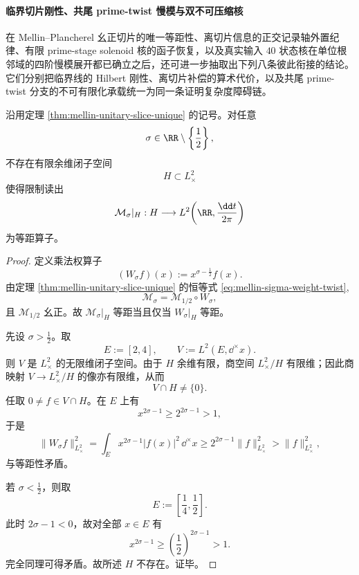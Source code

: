 \paragraph{临界切片刚性、共尾 prime-twist 慢模与双不可压缩核}\label{subsubsec:xi-time-part9v-critical-slice-cofinal-prime-twist-rigidity}
在 Mellin--Plancherel 幺正切片的唯一等距性、离切片信息的正交记录轴外置纪律、有限 prime-stage solenoid 核的函子恢复，以及真实输入 \(40\) 状态核在单位根邻域的四阶慢模展开都已确立之后，还可进一步抽取出下列八条彼此衔接的结论。它们分别把临界线的 Hilbert 刚性、离切片补偿的算术代价，以及共尾 prime-twist 分支的不可有限化承载统一为同一条证明复杂度障碍链。

\begin{theorem}[离开临界切片的有限余维不可修复性]\label{thm:xi-time-part9v-offcritical-finite-codim-nonrepairability}
沿用定理 \ref{thm:mellin-unitary-slice-unique} 的记号。对任意
\[
\sigma\in\RR\setminus\left\{\frac12\right\},
\]
不存在有限余维闭子空间
\[
H\subset L^2_\times
\]
使得限制读出
\[
\mathcal M_\sigma|_H:H\longrightarrow L^2\!\left(\RR,\frac{\dd t}{2\pi}\right)
\]
为等距算子。
\end{theorem}
\begin{proof}
定义乘法权算子
\[
(W_\sigma f)(x):=x^{\sigma-\frac12}f(x).
\]
由定理 \ref{thm:mellin-unitary-slice-unique} 的恒等式 \eqref{eq:mellin-sigma-weight-twist},
\[
\mathcal M_\sigma=\mathcal M_{1/2}\circ W_\sigma,
\]
且 \(\mathcal M_{1/2}\) 幺正。故 \(\mathcal M_\sigma|_H\) 等距当且仅当 \(W_\sigma|_H\) 等距。

先设 \(\sigma>\tfrac12\)。取
\[
E:=[2,4],
\qquad
V:=L^2(E,\dd^\times x).
\]
则 \(V\) 是 \(L^2_\times\) 的无限维闭子空间。由于 \(H\) 余维有限，商空间 \(L^2_\times/H\) 有限维；因此商映射 \(V\to L^2_\times/H\) 的像亦有限维，从而
\[
V\cap H\neq\{0\}.
\]
任取 \(0\neq f\in V\cap H\)。在 \(E\) 上有
\[
x^{2\sigma-1}\ge 2^{2\sigma-1}>1,
\]
于是
\[
\|W_\sigma f\|_{L^2_\times}^2
=
\int_E x^{2\sigma-1}|f(x)|^2\,\dd^\times x
\ge
2^{2\sigma-1}\|f\|_{L^2_\times}^2
>
\|f\|_{L^2_\times}^2,
\]
与等距性矛盾。

若 \(\sigma<\tfrac12\)，则取
\[
E:=\left[\frac14,\frac12\right].
\]
此时 \(2\sigma-1<0\)，故对全部 \(x\in E\) 有
\[
x^{2\sigma-1}\ge \left(\frac12\right)^{2\sigma-1}>1.
\]
完全同理可得矛盾。故所述 \(H\) 不存在。证毕。
\end{proof}

